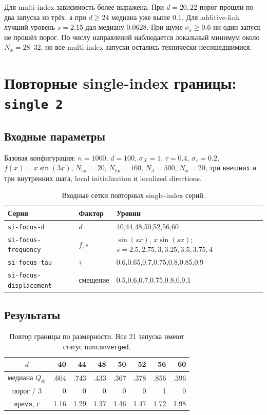 \documentclass[11pt,a4paper]{article}
\newcommand{\code}[1]{\texttt{#1}}
\newcommand{\qsi}{Q_{\mathrm{SI}}}
\begin{document}
Для multi-index зависимость более выражена. При $d=20,22$ порог прошли по два
запуска из трёх, а при $d\geq24$ медиана уже выше 0.1. Для additive-link
лучший уровень $s=2.15$ дал медиану 0.0628. При шуме
$\sigma_\varepsilon\geq0.6$ ни один запуск не прошёл порог. По числу
направлений наблюдается локальный минимум около $N_\phi=28$--32, но все
multi-index запуски остались технически несошедшимися.

\section{Повторные single-index границы: \code{single 2}}

\subsection{Входные параметры}

Базовая конфигурация: $n=1000$, $d=100$, $\sigma_X=1$, $\tau=0.4$,
$\sigma_\varepsilon=0.2$, $f(x)=x\sin(3x)$,
$N_{\mathrm{loc}}=20$, $N_{\mathrm{lin}}=160$, $N_J=500$,
$N_\phi=20$, три внешних и три внутренних шага, local initialization и
localized directions. 
\begin{table}[ht]
\centering
\small
\begin{tabular}{l|l|l}
\hline
Серия & Фактор & Уровни \\
\hline
\code{si-focus-d} & $d$ & 40,44,48,50,52,56,60 \\
\code{si-focus-frequency} & $f,s$ & $\sin(sx)$, $x\sin(sx)$; $s=2.5,2.75,3,3.25,3.5,3.75,4$ \\
\code{si-focus-tau} & $\tau$ & 0.6,0.65,0.7,0.75,0.8,0.85,0.9 \\
\code{si-focus-displacement} & смещение & 0.5,0.6,0.7,0.75,0.8,0.9,1 \\
\hline
\end{tabular}
\caption{Входные сетки повторных single-index серий.}
\label{tab:single2-inputs}
\end{table}

\subsection{Результаты}

\begin{table}[ht]
\centering
\small
\begin{tabular}{c|rrrrrrr}
\hline
$d$ & 40 & 44 & 48 & 50 & 52 & 56 & 60 \\
\hline
медиана $\qsi$ & .604 & .743 & .433 & .367 & .378 & .856 & .396 \\
порог / 3 & 0 & 0 & 0 & 0 & 0 & 1 & 0 \\
время, с & 1.16 & 1.29 & 1.37 & 1.46 & 1.47 & 1.72 & 1.98 \\
\hline
\end{tabular}
\caption{Повтор границы по размерности. Все 21 запуска имеют статус
\code{nonconverged}.}
\label{tab:single2-d}
\end{table}
\end{document}
